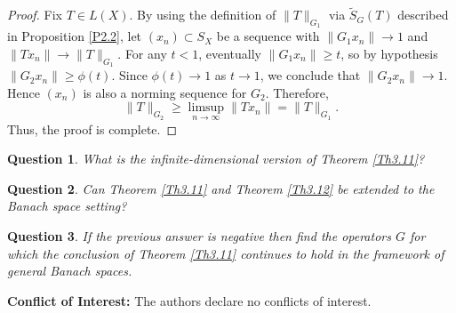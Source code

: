 \documentclass[12pt]{amsart}
\newtheorem{question}{Question}
\theoremstyle{definition}
\numberwithin{equation}{section}
\begin{document}
	\begin{proof}
		Fix $T \in L(X)$. By using the definition of $\|T\|_{G_1}$ via $\widetilde{S}_G(T)$ described in Proposition \ref{P2.2}, let $(x_n) \subset S_X$ be a sequence with $\|G_1x_n\| \to 1$ and $\|Tx_n\| \to \|T\|_{G_1}$. For any $t < 1$, eventually $\|G_1x_n\| \ge t$, so by hypothesis $\|G_2x_n\| \ge \phi(t)$. Since $\phi(t) \to 1$ as $t \to 1$, we conclude that $\|G_2x_n\| \to 1$. Hence $(x_n)$ is also a norming sequence for $G_2$. Therefore,
		\[
		\|T\|_{G_2} \ge \limsup_{n \to \infty} \|Tx_n\| = \|T\|_{G_1}.
		\]
		Thus, the proof is complete.
	\end{proof}
	
	\begin{question}
		What is the infinite-dimensional version of Theorem \ref{Th3.11}?
	\end{question}
	
	\begin{question}
		Can Theorem \ref{Th3.11} and Theorem \ref{Th3.12} be extended to the Banach space setting? 
	\end{question}
	
	\begin{question}
		If the previous answer is negative then find the operators $G$ for which the conclusion of Theorem \ref{Th3.11} continues to hold in the framework of general Banach spaces. 
	\end{question}
	
	
	\medskip
	
	
	\noindent
	\textbf{Conflict of Interest:} The authors declare no conflicts of interest. 
	
	
	
\end{document}
